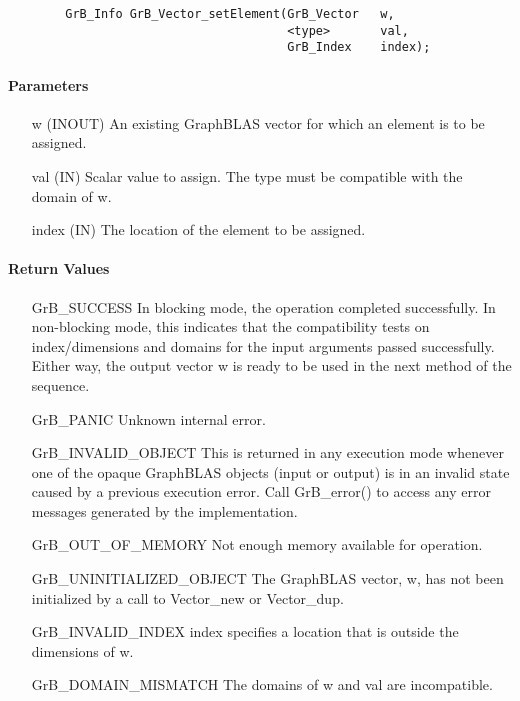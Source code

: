 \begin{verbatim}
        GrB_Info GrB_Vector_setElement(GrB_Vector   w,
                                       <type>       val,
                                       GrB_Index    index);
\end{verbatim}

\paragraph{Parameters}

\begin{itemize}[leftmargin=1.1in]
    \item[{\sf w}]   ({\sf INOUT}) An existing GraphBLAS vector for which an 
    element is to be assigned.

    \item[{\sf val}]   ({\sf IN}) Scalar value to assign.  The type must
    be compatible with the domain of {\sf w}.

    \item[{\sf index}] ({\sf IN}) The location of the element to be assigned.
\end{itemize}

\paragraph{Return Values}

\begin{itemize}[leftmargin=2.1in]
    \item[{\sf GrB\_SUCCESS}]         In blocking mode, the operation completed
    successfully. In non-blocking mode, this indicates that the compatibility 
    tests on index/dimensions and domains for the input arguments passed successfully. 
    Either way, the output vector {\sf w} is ready to be used in the next method of 
    the sequence.

    \item[{\sf GrB\_PANIC}]   Unknown internal error.
    
    \item[{\sf GrB\_INVALID\_OBJECT}] This is returned in any execution mode 
    whenever one of the opaque GraphBLAS objects (input or output) is in an invalid 
    state caused by a previous execution error.  Call {\sf GrB\_error()} to access 
    any error messages generated by the implementation.

    \item[{\sf GrB\_OUT\_OF\_MEMORY}]  Not enough memory available for operation.
    
    \item[{\sf GrB\_UNINITIALIZED\_OBJECT}]  The GraphBLAS vector, {\sf w}, has 
    not been initialized by a call to {\sf Vector\_new} or {\sf Vector\_dup}.
    
    \item[{\sf GrB\_INVALID\_INDEX}]  {\sf index} specifies a location 
    that is outside the dimensions of {\sf w}.

    \item[{\sf GrB\_DOMAIN\_MISMATCH}]     The domains of {\sf w} and {\sf val}
    are incompatible.
\end{itemize}

